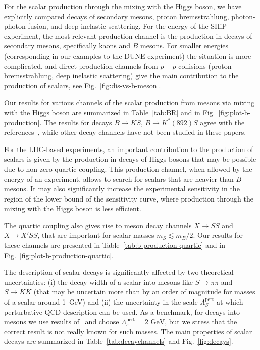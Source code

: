 \documentclass[a4paper,12pt,dvipsnames,usernames]{article}
\begin{document}
For the scalar production through the mixing with the Higgs boson, we have explicitly compared decays of secondary mesons, proton bremsstrahlung, photon-photon fusion, and deep inelastic scattering. For the energy of the SHiP experiment, the most relevant production channel is the production in decays of secondary mesons, specifically kaons and $B$ mesons. For smaller energies (corresponding in our examples to the DUNE experiment) the situation is more complicated, and direct production channels from $p-p$ collisions (proton bremsstrahlung, deep inelastic scattering) give the main contribution to the production of scalars, see Fig.~\ref{fig:dis-vs-b-meson}.
 
Our results for various channels of the scalar production from mesons via mixing with the Higgs boson are summarized in Table~\ref{tab:BR} and in Fig.~\ref{fig:plot-b-production}. The results for decays $B\to KS$, $B\to K^{*}(892)S$ agree with the references~\cite{Bezrukov:2009yw,Clarke:2013aya,Winkler:2018qyg,Bird:2004ts,Pospelov:2007mp,Batell:2009jf}, while other decay channels have not been studied in these papers.

For the LHC-based experiments, an important contribution to the production of scalars is given by the production in decays of Higgs bosons that may be possible due to non-zero quartic coupling.  This production channel, when allowed by the energy of an experiment, allows to search for scalars that are heavier than $B$ mesons. It may also significantly increase the experimental sensitivity in the region of the lower bound of the sensitivity curve, where production through the mixing with the Higgs boson is less efficient. 

The quartic coupling also gives rise to meson decay channels $X\to SS$ and $X\to X' SS$, that are important for scalar masses $m_S \lesssim m_B/2$. Our results for these channels are presented in Table~\ref{tab:b-production-quartic} and in Fig.~\ref{fig:plot-b-production-quartic}.
 
The description of scalar decays is significantly affected by two theoretical uncertainties: (i) the decay width of a scalar into mesons like $S\to \pi \pi$ and $S \to KK$ (that may be uncertain more than by an order of magnitude for masses of a scalar around 1~GeV) and (ii) the uncertainty in the scale $\Lambda_S^{\text{pert}}$ at which perturbative QCD description can be used. As a benchmark, for decays into mesons we use results of~\cite{Winkler:2018qyg} and choose  $\Lambda_{s}^{\text{pert}} = 2\text{ GeV}$, but we stress that the correct result is not really known for such masses. The main properties of scalar decays are summarized in Table~\ref{tab:decaychannels} and Fig.~\ref{fig:decays}.
\end{document}
